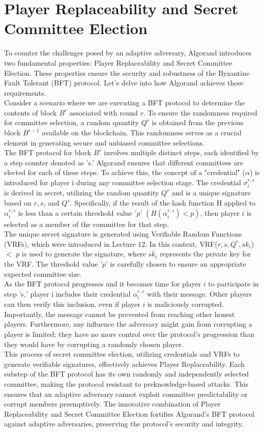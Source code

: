 \section{Player Replaceability and Secret Committee Election}
To counter the challenges posed by an adaptive adversary, Algorand introduces two fundamental properties: Player Replaceability and Secret Committee Election. These properties ensure the security and robustness of the Byzantine Fault Tolerant (BFT) protocol. Let's delve into how Algorand achieves these requirements.\\
Consider a scenario where we are executing a BFT protocol to determine the contents of block $B^{r}$ associated with round $r$. To ensure the randomness required for committee selection, a random quantity $Q^{r}$ is obtained from the previous block $B^{r-1}$ available on the blockchain. This randomness serves as a crucial element in generating secure and unbiased committee selections.\\
The BFT protocol for block $B^{r}$ involves multiple distinct steps, each identified by a step counter denoted as 's.' Algorand ensures that different committees are elected for each of these steps. To achieve this, the concept of a "credential" ($\alpha$) is introduced for player i during any committee selection stage. The credential $\sigma_{i}^{r, s}$ is derived in secret, utilizing the random quantity $Q^{r}$ and is a unique signature based on $r, s$, and $Q^{r}$. Specifically, if the result of the hash function H applied to $\alpha_{i}^{r, s}$ is less than a certain threshold value '$p$' $(H(\alpha_{i}^{r, s}) < p)$, then player $i$ is selected as a member of the committee for that step.\\
The unique secret signature is generated using Verifiable Random Functions (VRFs), which were introduced in Lecture 12. In this context, VRF($r, s, Q^{r}, sk_{i}$) $<$ $p$ is used to generate the signature, where $sk_{i}$ represents the private key for the VRF. The threshold value '$p$' is carefully chosen to ensure an appropriate expected committee size.\\
As the BFT protocol progresses and it becomes time for player $i$ to participate in step 's,' player i includes their credential $\alpha_{i}^{r, s}$ with their message. Other players can then verify this inclusion, even if player $i$ is maliciously corrupted. Importantly, the message cannot be prevented from reaching other honest players. Furthermore, any influence the adversary might gain from corrupting a player is limited; they have no more control over the protocol's progression than they would have by corrupting a randomly chosen player.\\
This process of secret committee election, utilizing credentials and VRFs to generate verifiable signatures, effectively achieves Player Replaceability. Each substep of the BFT protocol has its own randomly and independently selected committee, making the protocol resistant to preknowledge-based attacks. This ensures that an adaptive adversary cannot exploit committee predictability or corrupt members preemptively. The innovative combination of Player Replaceability and Secret Committee Election fortifies Algorand's BFT protocol against adaptive adversaries, preserving the protocol's security and integrity.
